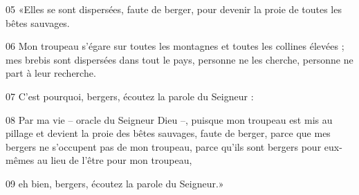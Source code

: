 
05 «Elles se sont dispersées, faute de berger, pour devenir la proie de toutes les bêtes sauvages.

06 Mon troupeau s’égare sur toutes les montagnes et toutes les collines élevées ; mes brebis sont dispersées dans tout le pays, personne ne les cherche, personne ne part à leur recherche.

07 C’est pourquoi, bergers, écoutez la parole du Seigneur :

08 Par ma vie – oracle du Seigneur Dieu –, puisque mon troupeau est mis au pillage et devient la proie des bêtes sauvages, faute de berger, parce que mes bergers ne s’occupent pas de mon troupeau, parce qu’ils sont bergers pour eux-mêmes au lieu de l’être pour mon troupeau,

09 eh bien, bergers, écoutez la parole du Seigneur.»
